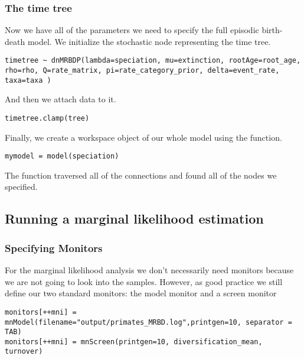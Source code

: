 \subsubsection{The time tree}

Now we have all of the parameters we need to specify the full episodic birth-death model. 
We initialize the stochastic node representing the time tree.
{\tt \begin{snugshade*}
\begin{lstlisting}
timetree ~ dnMRBDP(lambda=speciation, mu=extinction, rootAge=root_age, rho=rho, Q=rate_matrix, pi=rate_category_prior, delta=event_rate, taxa=taxa )
\end{lstlisting}
\end{snugshade*}}
And then we attach data to it.
{\tt \begin{snugshade*}
\begin{lstlisting}
timetree.clamp(tree)
\end{lstlisting}
\end{snugshade*}}



Finally, we create a workspace object of our whole model using the  function. 
{\tt \begin{snugshade*}
\begin{lstlisting}
mymodel = model(speciation)
\end{lstlisting}
\end{snugshade*}}

The  function traversed all of the connections and found all of the nodes we specified. 


\subsection{Running a marginal likelihood estimation}

\subsubsection{Specifying Monitors}

For the marginal likelihood analysis we don't necessarily need monitors because we are not going to look into the samples.
However, as good practice we still define our two standard monitors: the model monitor and a screen monitor
{\tt \begin{snugshade*}
\begin{lstlisting}
monitors[++mni] = mnModel(filename="output/primates_MRBD.log",printgen=10, separator = TAB)
monitors[++mni] = mnScreen(printgen=10, diversification_mean, turnover)
\end{lstlisting}
\end{snugshade*}}

